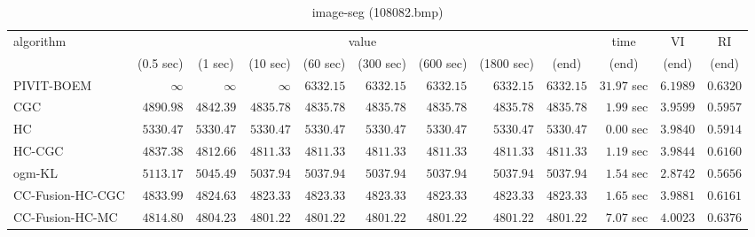 \begin{table}[H]
\scriptsize
\centering
\caption{image-seg (108082.bmp)}
\label{tab:anytimetable-image-seg-108082.bmp}
\begin{tabular}{lrrrrrrrrrrr}
\toprule
           algorithm &                                   \multicolumn{8}{c}{value} & \multicolumn{1}{c}{time}    & \multicolumn{1}{c}{VI}  & \multicolumn{1}{c}{RI} \\  
\cmidrule(lr){2-9}\cmidrule(lr){10-10} \cmidrule(lr){11-11} \cmidrule(lr){12-12}   
                     & \multicolumn{1}{c}{(0.5 sec)} & \multicolumn{1}{c}{(1 sec)} & \multicolumn{1}{c}{(10 sec)} & \multicolumn{1}{c}{(60 sec)} & \multicolumn{1}{c}{(300 sec)} & \multicolumn{1}{c}{(600 sec)} & \multicolumn{1}{c}{(1800 sec)} & \multicolumn{1}{c}{(end)} & \multicolumn{1}{c}{(end)}    & \multicolumn{1}{c}{(end)}   & \multicolumn{1}{c}{(end)}  \\ \midrule 
          PIVIT-BOEM & $\infty$ & $\infty$ & $\infty$ & $      6332.15$ & $      6332.15$ & $      6332.15$ & $      6332.15$ & $      6332.15$ & $        31.97$ sec    & $       6.1989$  & $       0.6320$ \\ 
                 CGC & $      4890.98$ & $      4842.39$ & $      4835.78$ & $      4835.78$ & $      4835.78$ & $      4835.78$ & $      4835.78$ & $      4835.78$ & $         1.99$ sec    & $       3.9599$  & $       0.5957$ \\ 
                  HC & $      5330.47$ & $      5330.47$ & $      5330.47$ & $      5330.47$ & $      5330.47$ & $      5330.47$ & $      5330.47$ & $      5330.47$ & $         0.00$ sec    & $       3.9840$  & $       0.5914$ \\ 
              HC-CGC & $      4837.38$ & $      4812.66$ & $      4811.33$ & $      4811.33$ & $      4811.33$ & $      4811.33$ & $      4811.33$ & $      4811.33$ & $         1.19$ sec    & $       3.9844$  & $       0.6160$ \\ 
              ogm-KL & $      5113.17$ & $      5045.49$ & $      5037.94$ & $      5037.94$ & $      5037.94$ & $      5037.94$ & $      5037.94$ & $      5037.94$ & $         1.54$ sec    & $       2.8742$  & $       0.5656$ \\ 
    CC-Fusion-HC-CGC & $      4833.99$ & $      4824.63$ & $      4823.33$ & $      4823.33$ & $      4823.33$ & $      4823.33$ & $      4823.33$ & $      4823.33$ & $         1.65$ sec    & $       3.9881$  & $       0.6161$ \\ 
     CC-Fusion-HC-MC & $      4814.80$ & $      4804.23$ & $      4801.22$ & $      4801.22$ & $      4801.22$ & $      4801.22$ & $      4801.22$ & $      4801.22$ & $         7.07$ sec    & $       4.0023$  & $       0.6376$ \\ 

\end{tabular}
\end{table}
